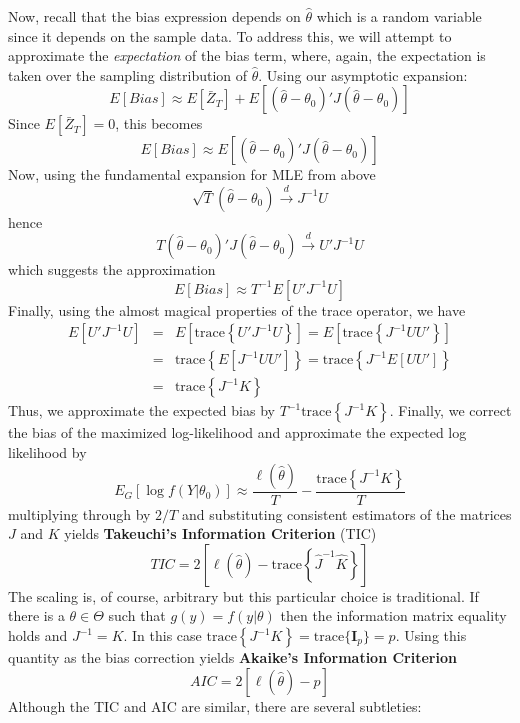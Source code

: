 Now, recall that the bias expression depends on $\widehat{\theta}$ which is a random variable since it depends on the sample data. To address this, we will attempt to approximate the \emph{expectation} of the bias term, where, again, the expectation is taken over the sampling distribution of $\widehat{\theta}$. Using our asymptotic expansion:
$$E[Bias] \approx E[\bar{Z}_T] + E[(\widehat{\theta} - \theta_0)' J (\widehat{\theta} - \theta_0)]$$
Since $E[\bar{Z}_T] = 0$, this becomes
$$E[Bias] \approx E[(\widehat{\theta} - \theta_0)' J (\widehat{\theta} - \theta_0)]$$
Now, using the fundamental expansion for MLE from above
$$\sqrt{T}\left(\widehat{\theta} - \theta_0 \right) \overset{d}{\rightarrow} J^{-1}U$$
hence
$$T\left(\widehat{\theta} - \theta_0 \right)'J\left(\widehat{\theta} - \theta_0 \right) \overset{d}{\rightarrow} U' J^{-1} U$$
which suggests the approximation
$$E[Bias] \approx T^{-1} E[U'J^{-1}U]$$
Finally, using the almost magical properties of the trace operator, we have
\begin{eqnarray*}
E[U'J^{-1}U] &=& E\left[\mbox{trace} \left\{ U'J^{-1}U\right\} \right] = E\left[\mbox{trace} \left\{ J^{-1}UU'\right\} \right]\\
&=& \mbox{trace}\left\{ E[J^{-1}UU']\right\} = \mbox{trace}\left\{J^{-1} E[UU']\right\} \\
&=&\mbox{trace}\left\{ J^{-1} K\right\}
\end{eqnarray*}
Thus, we approximate the expected bias by $T^{-1}\mbox{trace}\left\{ J^{-1} K\right\}$. Finally, we correct the bias of the maximized log-likelihood and approximate the expected log likelihood by
$$E_G[\log f(Y|\theta_0)]\approx \frac{\ell(\widehat{\theta})}{T} - \frac{\mbox{trace}\left\{ J^{-1} K\right\}}{T}$$
multiplying through by $2/T$ and substituting consistent estimators of the matrices $J$ and $K$ yields \textbf{Takeuchi's Information Criterion} (TIC)
$$TIC = 2\left[\ell(\widehat{\theta}) - \mbox{trace}\left\{ \widehat{J}^{-1} \widehat{K}\right\} \right]$$
The scaling is, of course, arbitrary but this particular choice is traditional. If there is a $\theta \in \Theta$ such that $g(y) = f(y|\theta)$ then the information matrix equality holds and $J^{-1} = K$. In this case $\mbox{trace}\left\{ J^{-1} K\right\} = \mbox{trace}\{\mathbf{I}_p\} = p$. Using this quantity as the bias correction yields \textbf{Akaike's Information Criterion}
$$AIC = 2 \left[\ell(\widehat{\theta}) - p \right]$$
Although the TIC and AIC are similar, there are several subtleties:
